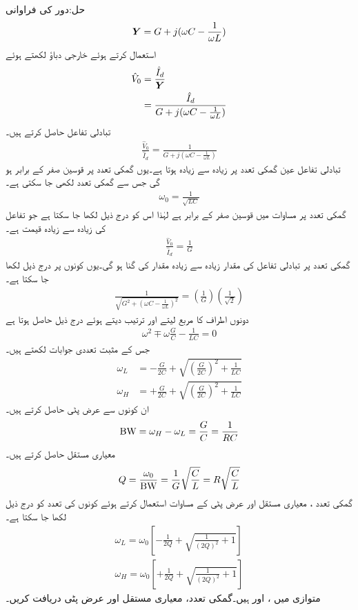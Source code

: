حل:دور کی فراوانی
\begin{align*}
{\ensuremath{{\boldsymbol{Y}}}}=G+j(\omega C-\frac{1}{\omega L})
\end{align*}
استعمال کرتے ہوئے خارجی دباؤ لکھتے ہوئے
\begin{align*}
\hat{V}_0&=\frac{\hat{I}_d}{{{\boldsymbol{Y}}}}\\
&=\frac{\hat{I}_d}{G+j(\omega C-\frac{1}{\omega L})}
\end{align*}
تبادلی تفاعل حاصل کرتے ہیں۔
\begin{align}\label{مساوات_تعددی_متوازی_تبادلی_تفاعل_داخلی_رو}
\frac{\hat{V}_0}{\hat{I}_d}=\frac{1}{G+j(\omega C-\frac{1}{\omega L})}
\end{align}
تبادلی تفاعل عین گمکی تعدد پر زیادہ سے زیادہ ہوتا ہے۔یوں گمکی تعدد پر قوسین صفر کے برابر ہو گی جس سے گمکی تعدد لکھی جا سکتی ہے۔
\begin{align}
\omega_0=\frac{1}{\sqrt{LC}}
\end{align}
گمکی تعدد پر مساوات  میں قوسین صفر کے برابر ہے لہٰذا اس کو درج ذیل لکھا جا سکتا ہے جو تفاعل کی زیادہ سے زیادہ قیمت ہے۔
\begin{align}\label{مساوات_تعددی_متوازی_تبادلی_تفاعل_زیادہ}
\frac{\hat{V}_0}{\hat{I}_d}=\frac{1}{G}
\end{align}
گمکی تعدد پر تبادلی تفاعل کی مقدار زیادہ سے زیادہ مقدار کی  گنا ہو گی۔یوں کونوں پر درج ذیل لکھا جا سکتا ہے۔
\begin{align}
\frac{1}{\sqrt{G^2+(\omega C-\frac{1}{\omega L})^2}}=\left(\frac{1}{G}\right)\left(\frac{1}{\sqrt{2}}\right)
\end{align}
دونوں اطراف کا مربع لیتے اور ترتیب دیتے ہوئے درج ذیل حاصل ہوتا ہے
\begin{align}
\omega^2\mp \omega \frac{G}{C} -\frac{1}{LC}=0
\end{align}
جس کے مثبت تعددی جوابات لکھتے ہیں۔
\begin{align}
\omega_{L}&=-\frac{G}{2C}+\sqrt{\left(\frac{G}{2C}\right)^2+\frac{1}{LC}}\\
\omega_{H}&=+\frac{G}{2C}+\sqrt{\left(\frac{G}{2C}\right)^2+\frac{1}{LC}}
\end{align}
ان کونوں سے عرض پٹی حاصل کرتے ہیں۔
\begin{align}
{\ensuremath{{\textup{BW}}}}=\omega_{H}-\omega_{L}=\frac{G}{C}=\frac{1}{RC}
\end{align}
معیاری مستقل حاصل کرتے ہیں۔
\begin{align}
Q=\frac{\omega_0}{{{\textup{BW}}}}=\frac{1}{G}\sqrt{\frac{C}{L}}=R\sqrt{\frac{C}{L}}
\end{align}
گمکی تعدد ، معیاری مستقل اور عرض پٹی کے مساوات استعمال کرتے ہوئے کونوں کی تعدد کو درج ذیل لکھا جا سکتا ہے۔
\begin{align}
\omega_{L}=\omega_0 \left[-\frac{1}{2Q}+\sqrt{\frac{1}{(2Q)^2}+1}\right]\\
\omega_{H}=\omega_0 \left[+\frac{1}{2Q}+\sqrt{\frac{1}{(2Q)^2}+1}\right]
\end{align}
متوازی  میں ،  اور  ہیں۔گمکی تعدد، معیاری مستقل اور عرض پٹی دریافت کریں۔

